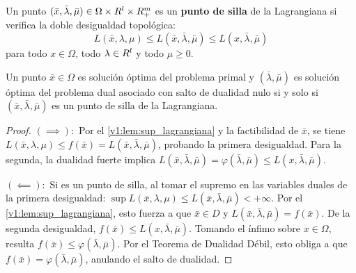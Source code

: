 \begin{definition}\label{v1:def:punto_silla}
    Un punto $(\bar{x}, \bar{\lambda}, \bar{\mu}) \in \Omega \times R^l \times R^m_+$ es un \textbf{punto de silla} de la Lagrangiana si verifica la doble desigualdad topológica:
    \begin{equation}
        L(\bar{x}, \lambda, \mu) \le L(\bar{x}, \bar{\lambda}, \bar{\mu}) \le L(x, \bar{\lambda}, \bar{\mu})
        \label{v1:eq:punto_silla}
    \end{equation}
    para todo $x \in \Omega$, todo $\lambda \in R^l$ y todo $\mu \ge 0$.
\end{definition}

\begin{theorem}\label{v1:thm:teorema_punto_silla}
    Un punto $\bar{x} \in \Omega$ es solución óptima del problema primal y $(\bar{\lambda}, \bar{\mu})$ es solución óptima del problema dual asociado con salto de dualidad nulo si y solo si $(\bar{x}, \bar{\lambda}, \bar{\mu})$ es un punto de silla de la Lagrangiana.
\end{theorem}

\begin{proof}
    \( (\implies ): \) Por el \cref{v1:lem:sup_lagrangiana} y la factibilidad de $\bar{x}$, se tiene $L(\bar{x}, \lambda, \mu) \le f(\bar{x}) = L(\bar{x}, \bar{\lambda}, \bar{\mu})$, probando la primera desigualdad. Para la segunda, la dualidad fuerte implica $L(\bar{x}, \bar{\lambda}, \bar{\mu}) = \varphi(\bar{\lambda}, \bar{\mu}) \le L(x, \bar{\lambda}, \bar{\mu})$.
    
    \( (\impliedby ): \) Si es un punto de silla, al tomar el supremo en las variables duales de la primera desigualdad: $\sup L(\bar{x}, \lambda, \mu) \le L(\bar{x}, \bar{\lambda}, \bar{\mu}) < +\infty$. Por el \cref{v1:lem:sup_lagrangiana}, esto fuerza a que $\bar{x} \in D$ y $L(\bar{x}, \bar{\lambda}, \bar{\mu}) = f(\bar{x})$. De la segunda desigualdad, $f(\bar{x}) \le L(x, \bar{\lambda}, \bar{\mu})$. Tomando el ínfimo sobre $x \in \Omega$, resulta $f(\bar{x}) \le \varphi(\bar{\lambda}, \bar{\mu})$. Por el Teorema de Dualidad Débil, esto obliga a que $f(\bar{x}) = \varphi(\bar{\lambda}, \bar{\mu})$, anulando el salto de dualidad.
\end{proof}

